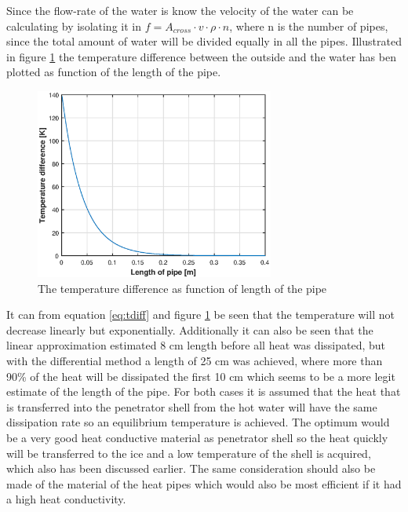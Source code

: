 Since the flow-rate of the water is know the velocity of the water can be calculating by isolating it in $f = A_{cross}\cdot v \cdot \rho \cdot n$, where n is the number of pipes, since the total amount of water will be divided equally in all the pipes. Illustrated in figure \ref{fig:watercool} the temperature difference between the outside and the water has ben plotted as function of the length of the pipe. 
\begin{figure}[htb]
  \centering
  \includegraphics[width=0.7\textwidth]{figures/Ricardo/watercooling.eps}
  \caption{The temperature difference as function of length of the pipe}
  \label{fig:watercool}
\end{figure}
It can from equation \ref{eq:tdiff} and figure \ref{fig:watercool} be seen that the temperature will not decrease linearly but exponentially. Additionally it can also be seen that the linear approximation estimated 8 cm length before all heat was dissipated, but with the differential method a length of 25 cm was achieved, where more than 90\% of the heat will be dissipated the first 10 cm which seems to be a more legit estimate of the length of the pipe. For both cases it is assumed that the heat that is transferred into the penetrator shell from the hot water will have the same dissipation rate so an equilibrium temperature is achieved. The optimum would be a very good heat conductive material as penetrator shell so the heat quickly will be transferred to the ice and a low temperature of the shell is acquired, which also has been discussed earlier. The same consideration should also be made of the material of the heat pipes which would also be most efficient if it had a high heat conductivity. \\

